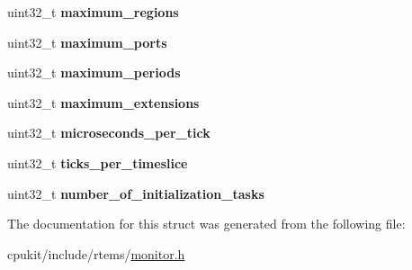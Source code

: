 \begin{DoxyCompactItemize}
uint32\+\_\+t {\bfseries maximum\+\_\+regions}
\item 
\mbox{\label{structrtems__monitor__config__t_a0103b34468a97267876e845fc8c30de9}} 
uint32\+\_\+t {\bfseries maximum\+\_\+ports}
\item 
\mbox{\label{structrtems__monitor__config__t_a5b784d29f5cf39f96cd051004fcd8cdc}} 
uint32\+\_\+t {\bfseries maximum\+\_\+periods}
\item 
\mbox{\label{structrtems__monitor__config__t_a558d6269e460472a719cfe3f2dd93980}} 
uint32\+\_\+t {\bfseries maximum\+\_\+extensions}
\item 
\mbox{\label{structrtems__monitor__config__t_a35e551ba8016a8cbdf06d2bba6bb4cf8}} 
uint32\+\_\+t {\bfseries microseconds\+\_\+per\+\_\+tick}
\item 
\mbox{\label{structrtems__monitor__config__t_a8544a52416fd1cc35c9048545c156a03}} 
uint32\+\_\+t {\bfseries ticks\+\_\+per\+\_\+timeslice}
\item 
\mbox{\label{structrtems__monitor__config__t_ac5463da187c204d6d0472aa55117cb9d}} 
uint32\+\_\+t {\bfseries number\+\_\+of\+\_\+initialization\+\_\+tasks}
\end{DoxyCompactItemize}


The documentation for this struct was generated from the following file\+:\begin{DoxyCompactItemize}
\item 
cpukit/include/rtems/\mbox{\hyperlink{monitor_8h}{monitor.\+h}}\end{DoxyCompactItemize}
